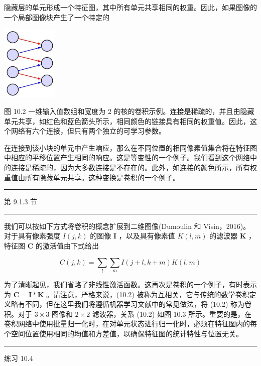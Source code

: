 \documentclass[10pt]{report}
\newcommand{\HRule}{\begin{center}\rule{0.9\linewidth}{0.2mm}\end{center}}
\begin{document}
隐藏层的单元形成一个特征图，其中所有单元共享相同的权重。因此，如果图像的一个局部图像块产生了一个特定的

\begin{center}
\includegraphics[max width=0.2\textwidth]{images/0194e279-9b28-703a-88f4-c3ac21e2010d_311_1204_345_286_384_0.jpg}
\end{center}
\hspace*{3em} 

图 10.2 一维输入值数组和宽度为 2 的核的卷积示例。连接是稀疏的，并且由隐藏单元共享，如红色和蓝色箭头所示，相同颜色的链接具有相同的权重值。因此，这个网络有六个连接，但只有两个独立的可学习参数。

在连接到该小块的单元中产生响应，那么在不同位置的相同像素值集合将在特征图中相应的平移位置产生相同的响应。这是等变性的一个例子。我们看到这个网络中的连接是稀疏的，因为大多数连接是不存在的。此外，如连接的颜色所示，所有权重值由所有隐藏单元共享。这种变换是卷积的一个例子。

\HRule

第 9.1.3 节

\HRule

我们可以按如下方式将卷积的概念扩展到二维图像(Dumoulin 和 Visin，2016)。对于具有像素强度 \(I\left( {j,k}\right)\) 的图像 \(\mathbf{I}\) ，以及具有像素值 \(K\left( {l,m}\right)\) 的滤波器 \(\mathbf{K}\) ，特征图 \(\mathbf{C}\) 的激活值由下式给出

\[
C\left( {j,k}\right)  = \mathop{\sum }\limits_{l}\mathop{\sum }\limits_{m}I\left( {j + l,k + m}\right) K\left( {l,m}\right)  \tag{10.2}
\]

为了清晰起见，我们省略了非线性激活函数。这再次是卷积的一个例子，有时表示为 \(\mathbf{C} = \mathbf{I} * \mathbf{K}\) 。请注意，严格来说，(10.2) 被称为互相关，它与传统的数学卷积定义略有不同，但在这里我们将遵循机器学习文献中的常见做法，将 (10.2) 称为卷积。对于 \(3 \times  3\) 图像和 \(2 \times  2\) 滤波器，关系 (10.2) 如图 10.3 所示。重要的是，在卷积网络中使用批量归一化时，在对单元状态进行归一化时，必须在特征图内的每个空间位置使用相同的均值和方差值，以确保特征图的统计特性与位置无关。

\HRule

练习 10.4
\end{document}
